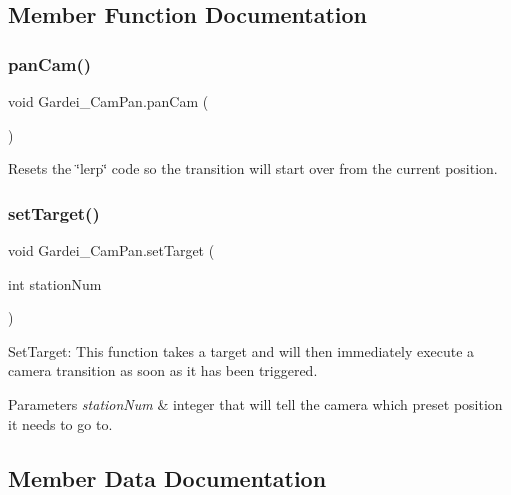 \subsection{Member Function Documentation}
\mbox{\label{class_gardei___cam_pan_a6ae5373621faf797c67ad4eb961f40ca}} 
\subsubsection{\texorpdfstring{pan\+Cam()}{panCam()}}
{\footnotesize\ttfamily void Gardei\+\_\+\+Cam\+Pan.\+pan\+Cam (\begin{DoxyParamCaption}{ }\end{DoxyParamCaption})}



Resets the \char`\"{}lerp\char`\"{} code so the transition will start over from the current position. 

\mbox{\label{class_gardei___cam_pan_a3800f7be72b1b6b893e00e2c6248bcba}} 
\subsubsection{\texorpdfstring{set\+Target()}{setTarget()}}
{\footnotesize\ttfamily void Gardei\+\_\+\+Cam\+Pan.\+set\+Target (\begin{DoxyParamCaption}\item[{int}]{station\+Num }\end{DoxyParamCaption})}



Set\+Target\+: This function takes a target and will then immediately execute a camera transition as soon as it has been triggered. 


\begin{DoxyParams}{Parameters}
{\em station\+Num} & integer that will tell the camera which preset position it needs to go to.\\
\hline
\end{DoxyParams}


\subsection{Member Data Documentation}
\mbox{\label{class_gardei___cam_pan_a22ff78b430a317e7871a396f35b097e6}} 
